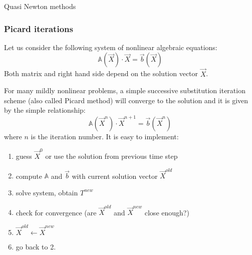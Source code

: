 

\Literature Quasi Newton methods \cite{ensb81}

\subsubsection{Picard iterations} \label{ss:picard}

Let us consider the following system of nonlinear algebraic equations:
\[
\mathbb{A}(\vec X) \cdot \vec X = \vec b(\vec X)
\]
Both matrix and right hand side depend on the solution vector $\vec X$.

For many mildly nonlinear problems, a simple successive substitution 
iteration scheme (also called Picard method) will converge to the solution
and it is given by the simple relationship:
\[
\mathbb{A}(\vec X^n) \cdot \vec X^{n+1} = \vec b(\vec X^n)
\]
where $n$ is the iteration number. 
It is easy to implement:
\begin{enumerate}
\item guess $\vec X^0$ or use the solution from previous time step
\item compute $\mathbb{A}$ and $\vec b$ with current solution vector $\vec X^{old}$
\item solve system, obtain $T^{new}$
\item check for convergence (are $\vec X^{old}$ and $\vec X^{new}$ close enough?)
\item $\vec X^{old} \leftarrow \vec X^{new}$
\item go back to 2.
\end{enumerate}

